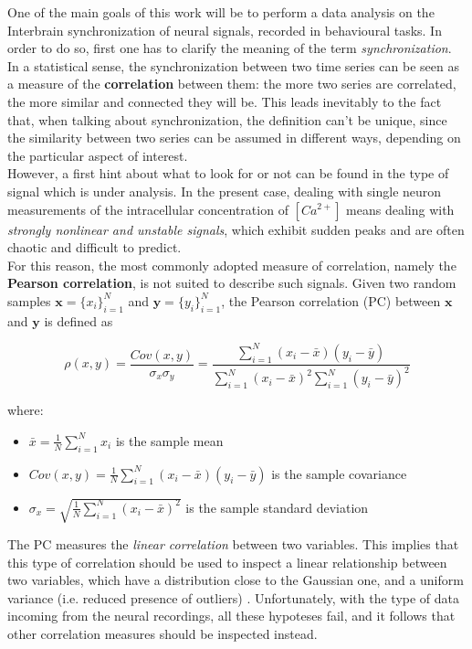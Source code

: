\documentclass[12pt, a4paper]{report}
\begin{document}
One of the main goals of this work will be to perform a data analysis on the Interbrain synchronization of neural signals, recorded in behavioural tasks. In order to do so, first one has to clarify the meaning of the term  \textit{synchronization}.\\
In a statistical sense, the synchronization between two time series can be seen as a measure of the \textbf{correlation} between them: the more two series are correlated, the more similar and connected they will be. This leads inevitably to the fact that, when talking about synchronization, the definition can't be unique, since the similarity between two series can be assumed in different ways, depending on the particular aspect of interest. \\
However, a first hint about what to look for or not can be found in the type of signal which is under analysis. In the present case, dealing with single neuron measurements of the intracellular concentration of $[Ca^{2+}]$ means dealing with \textit{strongly nonlinear and unstable signals}, which exhibit sudden peaks and are often chaotic and difficult to predict.\\
For this reason, the most commonly adopted measure of correlation, namely the \textbf{Pearson correlation}, is not suited to describe such signals. Given two random samples $ \textbf{x} = \{x_i\}_{i=1}^N$ and  $ \textbf{y} = \{y_i\}_{i=1}^N$, the Pearson correlation (PC) between  $ \textbf{x}$ and  $ \textbf{y}$ is defined as

\begin{equation}
	 \rho(x,y) = \frac{Cov(x,y)}{\sigma_x \sigma_y} = \frac{\sum_{i=1}^{N}(x_i-\bar{x}) (y_i-\bar{y})} {\sum_{i=1}^{N}(x_i-\bar{x})^2 \sum_{i=1}^{N} (y_i-\bar{y})^2} \label{pearson}
\end{equation}


where:
\begin{itemize}
	\item $ \bar{x} = \frac{1}{N}\sum_{i=1}^{N}x_i$ is the sample mean
	
	\item $Cov(x,y) = \frac{1}{N}\sum_{i=1}^{N}(x_i-\bar{x}) (y_i-\bar{y})$ is the sample covariance
	
	\item $\sigma_x = \sqrt{\frac{1}{N}\sum_{i=1}^{N}(x_i-\bar{x})^2}$ is the sample standard deviation
\end{itemize}

The PC measures the \textit{linear correlation} between two variables. This implies that this type of correlation should be used to inspect a linear relationship between two variables, which have a distribution close to the Gaussian one, and a uniform variance (i.e. reduced presence of outliers) \cite{17}. %
 Unfortunately, with the type of data incoming from the neural recordings, all these hypoteses fail, and it follows that other correlation measures should be inspected instead.
\end{document}
